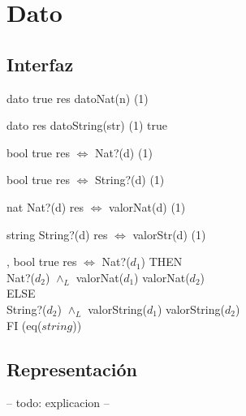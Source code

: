 \section{Dato}

\subsection{Interfaz}

\iusa{}

\ioperaciones

{} %
{dato} %
{true} %
{res \igobs datoNat(n)} %
{\bigo(1)} %
{} %
{} %

{}
{dato}
{}
{res \igobs datoString(str)}
{\bigo(1)}
{true}
{}

{}
{bool}
{true}
{res $\iff$ Nat?(d)}
{\bigo(1)}
{}
{}

{}
{bool}
{true}
{res $\iff$ String?(d)}
{\bigo(1)}
{}
{}

{}
{nat}
{Nat?(d)}
{res $\iff$ valorNat(d)}
{\bigo(1)}
{}
{}

{}
{string}
{String?(d)}
{res $\iff$ valorStr(d)}
{\bigo(1)}
{}
{}

\operacion{$\bullet = \bullet$}
{, }
{bool}
{true}
{res $\iff$ \IFL Nat?($d_1$) THEN \\
    \hspace*{10.5em} Nat?($d_2$) $\land_L$ valorNat($d_1$) \igobs valorNat($d_2$) \\
    \hspace*{9em} ELSE \\
    \hspace*{10.5em} String?($d_2$) $\land_L$ valorString($d_1$) \igobs valorString($d_2$) \\
    \hspace*{9em} FI }
{\bigo(eq($string$))}
{}
{}

\subsection{Representación}

-- todo: explicacion --


